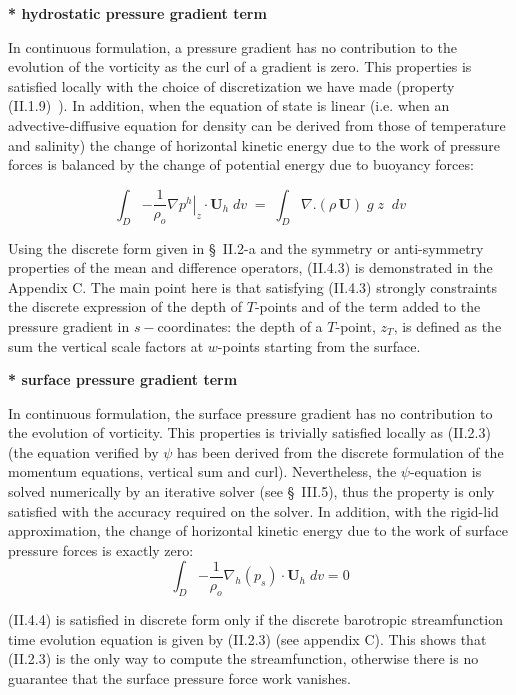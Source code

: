 \documentclass[../tex_main/NEMO_manual]{subfiles}
\begin{document}
\textbf{* hydrostatic pressure gradient term}

In continuous formulation, a pressure gradient has no contribution to the evolution of the vorticity as
the curl of a gradient is zero.
This properties is satisfied locally with the choice of discretization we have made (property (II.1.9)~).
In addition, when the equation of state is linear
(i.e. when an advective-diffusive equation for density can be derived from those of temperature and salinity)
the change of horizontal kinetic energy due to the work of pressure forces is balanced by the change of
potential energy due to buoyancy forces:

\begin{equation} \label{eq:hpg_pe}
\int_D {-\frac{1}{\rho _o }\left. {\nabla p^h} \right|_z \cdot {\textbf {U}}_h \;dv} \;=\;\int_D {\nabla .\left( {\rho \,{\textbf{U}}} \right)\;g\;z\;\;dv}
\end{equation}

Using the discrete form given in {\S}~II.2-a and the symmetry or anti-symmetry properties of
the mean and difference operators, (II.4.3) is demonstrated in the Appendix C.
The main point here is that satisfying (II.4.3) strongly constraints the discrete expression of the depth of 
$T$-points and of the term added to the pressure gradient in $s-$coordinates: the depth of a $T$-point, $z_T$,
is defined as the sum the vertical scale factors at $w$-points starting from the surface.

\textbf{* surface pressure gradient term}

In continuous formulation, the surface pressure gradient has no contribution to the evolution of vorticity.
This properties is trivially satisfied locally as (II.2.3)
(the equation verified by $\psi$ has been derived from the discrete formulation of the momentum equations,
vertical sum and curl).
Nevertheless, the $\psi$-equation is solved numerically by an iterative solver (see {\S}~III.5),
thus the property is only satisfied with the accuracy required on the solver.
In addition, with the rigid-lid approximation, the change of horizontal kinetic energy due to the work of 
surface pressure forces is exactly zero:
\begin{equation} \label{eq:spg}
\int_D {-\frac{1}{\rho _o }\nabla _h } \left( {p_s } \right)\cdot {\textbf{U}}_h \;dv=0
\end{equation}

(II.4.4) is satisfied in discrete form only if
the discrete barotropic streamfunction time evolution equation is given by (II.2.3) (see appendix C).
This shows that (II.2.3) is the only way to compute the streamfunction,
otherwise there is no guarantee that the surface pressure force work vanishes.
\end{document}
